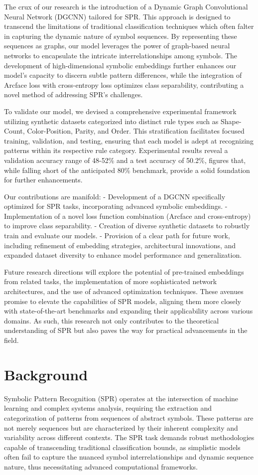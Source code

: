 \documentclass{article}
\begin{document}
The crux of our research is the introduction of a Dynamic Graph Convolutional Neural Network (DGCNN) tailored for SPR. This approach is designed to transcend the limitations of traditional classification techniques which often falter in capturing the dynamic nature of symbol sequences. By representing these sequences as graphs, our model leverages the power of graph-based neural networks to encapsulate the intricate interrelationships among symbols. The development of high-dimensional symbolic embeddings further enhances our model's capacity to discern subtle pattern differences, while the integration of Arcface loss with cross-entropy loss optimizes class separability, contributing a novel method of addressing SPR's challenges.

To validate our model, we devised a comprehensive experimental framework utilizing synthetic datasets categorized into distinct rule types such as Shape-Count, Color-Position, Parity, and Order. This stratification facilitates focused training, validation, and testing, ensuring that each model is adept at recognizing patterns within its respective rule category. Experimental results reveal a validation accuracy range of 48-52\% and a test accuracy of 50.2\%, figures that, while falling short of the anticipated 80\% benchmark, provide a solid foundation for further enhancements.

Our contributions are manifold:
- Development of a DGCNN specifically optimized for SPR tasks, incorporating advanced symbolic embeddings.
- Implementation of a novel loss function combination (Arcface and cross-entropy) to improve class separability.
- Creation of diverse synthetic datasets to robustly train and evaluate our models.
- Provision of a clear path for future work, including refinement of embedding strategies, architectural innovations, and expanded dataset diversity to enhance model performance and generalization.

Future research directions will explore the potential of pre-trained embeddings from related tasks, the implementation of more sophisticated network architectures, and the use of advanced optimization techniques. These avenues promise to elevate the capabilities of SPR models, aligning them more closely with state-of-the-art benchmarks and expanding their applicability across various domains. As such, this research not only contributes to the theoretical understanding of SPR but also paves the way for practical advancements in the field.

\section{Background}
Symbolic Pattern Recognition (SPR) operates at the intersection of machine learning and complex systems analysis, requiring the extraction and categorization of patterns from sequences of abstract symbols. These patterns are not merely sequences but are characterized by their inherent complexity and variability across different contexts. The SPR task demands robust methodologies capable of transcending traditional classification bounds, as simplistic models often fail to capture the nuanced symbol interrelationships and dynamic sequence nature, thus necessitating advanced computational frameworks.
\end{document}
